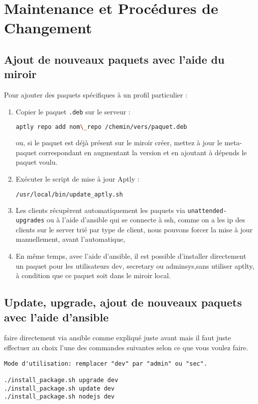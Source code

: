 \documentclass[a4paper,12pt]{article}
\begin{document}
\section{Maintenance et Procédures de Changement}
\subsection{Ajout de nouveaux paquets avec l'aide du miroir}
Pour ajouter des paquets spécifiques à un profil particulier :

\begin{enumerate}
\item Copier le paquet \texttt{.deb} sur le serveur :
\begin{lstlisting}[language=bash]
aptly repo add nom\_repo /chemin/vers/paquet.deb
\end{lstlisting}
ou, si le paquet est déjà présent sur le miroir créer, mettez à jour le meta-paquet correspondant en augmentant la version et en ajoutant à dépends le paquet voulu.
\item Exécuter le script de mise à jour Aptly :
\begin{lstlisting}[language=bash]
/usr/local/bin/update_aptly.sh
\end{lstlisting}
\item Les clients récupèrent automatiquement les paquets via \texttt{unattended-upgrades} ou à l'aide d'ansible qui se connecte à ssh, comme on a les ip des clients sur le server trié par type de client, nous pouvons forcer la mise à jour manuellement, avant l'automatique, 

\item En même temps, avec l'aide d'ansible, il est possible d'installer directement un paquet pour les utilisateurs dev, secretary ou adminsys,sans utiliser aptlty, à condition que ce paquet soit dans le miroir local.
\end{enumerate}

\subsection{Update, upgrade, ajout de nouveaux paquets avec l'aide d'ansible}
faire directement via ansible comme expliqué juste avant mais il faut juste effectuer au choix l'une des commandes suivantes selon ce que vous voulez faire.
\begin{lstlisting}
Mode d'utilisation: remplacer "dev" par "admin" ou "sec".

./install_package.sh upgrade dev
./install_package.sh update dev
./install_package.sh nodejs dev
\end{lstlisting}
\end{document}

